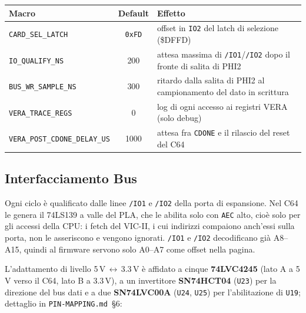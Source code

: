 \documentclass[12pt, a4paper]{article}
\begin{document}
\begin{center}
\begin{tabular}{lcp{8cm}}
\toprule
\textbf{Macro} & \textbf{Default} & \textbf{Effetto} \\
\midrule
\texttt{CARD\_SEL\_LATCH}           & \texttt{0xFD} & offset in \texttt{IO2} del latch di selezione (\$DFFD) \\
\texttt{IO\_QUALIFY\_NS}            & 200  & attesa massima di \texttt{/IO1}/\texttt{/IO2} dopo il fronte di salita di PHI2 \\
\texttt{BUS\_WR\_SAMPLE\_NS}        & 300  & ritardo dalla salita di PHI2 al campionamento del dato in scrittura \\
\texttt{VERA\_TRACE\_REGS}          & 0    & log di ogni accesso ai registri VERA (solo debug) \\
\texttt{VERA\_POST\_CDONE\_DELAY\_US} & 1000 & attesa fra \texttt{CDONE} e il rilascio del reset del C64 \\
\bottomrule
\end{tabular}
\end{center}

\subsection{Interfacciamento Bus}
Ogni ciclo è qualificato dalle linee \texttt{/IO1} e \texttt{/IO2} della porta di espansione. Nel C64 le genera il 74LS139 a valle del PLA, che le abilita solo con \texttt{AEC} alto, cioè solo per gli accessi della CPU: i fetch del VIC-II, i cui indirizzi compaiono anch'essi sulla porta, non le asseriscono e vengono ignorati. \texttt{/IO1} e \texttt{/IO2} decodificano già A8--A15, quindi al firmware servono solo A0--A7 come offset nella pagina.

\begin{sloppypar}
L'adattamento di livello 5\,V\,$\leftrightarrow$\,3.3\,V è affidato a cinque \textbf{74LVC4245} (lato A a 5\,V verso il C64, lato B a 3.3\,V), a un invertitore \textbf{SN74HCT04} (\texttt{U23}) per la direzione del bus dati e a due \textbf{SN74LVC00A} (\texttt{U24}, \texttt{U25}) per l'abilitazione di \texttt{U19}; dettaglio in \texttt{PIN-MAPPING.md}~\S6:
\end{sloppypar}
\end{document}
